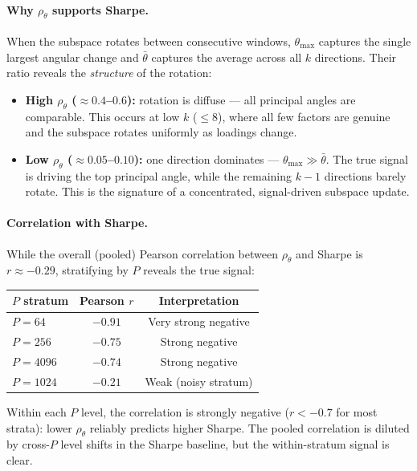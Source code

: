 \documentclass[11pt,a4paper]{article}
\begin{document}
\paragraph{Why $\rho_\theta$ supports Sharpe.}
When the subspace rotates between consecutive windows, $\theta_{\max}$ captures the single largest angular change and $\bar\theta$ captures the average across all $k$ directions.  Their ratio reveals the \emph{structure} of the rotation:
\begin{itemize}[nosep]
  \item \textbf{High $\rho_\theta$ ($\approx 0.4$--$0.6$):}  rotation is diffuse --- all principal angles are comparable.  This occurs at low $k$ ($\leq 8$), where all few factors are genuine and the subspace rotates uniformly as loadings change.
  \item \textbf{Low $\rho_\theta$ ($\approx 0.05$--$0.10$):}  one direction dominates --- $\theta_{\max} \gg \bar\theta$.  The true signal is driving the top principal angle, while the remaining $k - 1$ directions barely rotate.  This is the signature of a concentrated, signal-driven subspace update.
\end{itemize}

\paragraph{Correlation with Sharpe.}
While the overall (pooled) Pearson correlation between $\rho_\theta$ and Sharpe is $r \approx -0.29$, stratifying by $P$ reveals the true signal:
\begin{center}
\small
\begin{tabular}{lcc}
\toprule
$P$ stratum & Pearson $r$ & Interpretation \\
\midrule
$P = 64$   & $-0.91$ & Very strong negative \\
$P = 256$  & $-0.75$ & Strong negative \\
$P = 4096$ & $-0.74$ & Strong negative \\
$P = 1024$ & $-0.21$ & Weak (noisy stratum) \\
\bottomrule
\end{tabular}
\end{center}
Within each $P$ level, the correlation is strongly negative ($r < -0.7$ for most strata): lower $\rho_\theta$ reliably predicts higher Sharpe.  The pooled correlation is diluted by cross-$P$ level shifts in the Sharpe baseline, but the within-stratum signal is clear.
\end{document}

